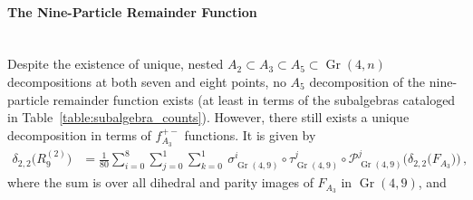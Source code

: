 \documentclass[11pt]{article}
\DeclareMathOperator{\Gr}{Gr}
\begin{document}
\paragraph{The Nine-Particle Remainder Function}~\\[-10pt]

\noindent Despite the existence of unique, nested $A_2 \subset A_3 \subset A_5 \subset \Gr(4,n)$ decompositions at both seven and eight points, no $A_5$ decomposition of the nine-particle remainder function exists (at least in terms of the subalgebras cataloged in Table~\ref{table:subalgebra_counts}). However, there still exists a unique decomposition in terms of $f_{A_3}^{+-}$ functions. It is given by
\begin{align}\label{eq:r29A3}
\delta_{2,2} \big(R^{(2)}_9\big) &= \frac{1}{80} \sum_{i = 0}^8 \sum_{j=0}^1 \sum_{k=0}^1 \ \sigma_{\Gr(4,9)}^i \circ \tau_{\Gr(4,9)}^j \circ {\mathcal{P}}_{\Gr(4,9)}^j   \Big(\delta_{2,2} \big(F_{A_3} \big)\Big) \, ,
\end{align}
where the sum is over all dihedral and parity images of $F_{A_3}$ in $\Gr(4,9)$, and
\end{document}
